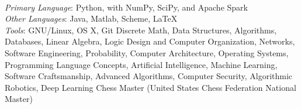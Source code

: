 \documentclass[11pt]{article}
\begin{document}
\begin{adjustwidth}{-2.2cm}{-2.2cm}
    ~\\[0.01\baselineskip]
    \emph{Primary Language}: Python, with NumPy, SciPy, and Apache Spark\\
    \emph{Other Languages}: Java, Matlab, Scheme, \LaTeX\\
    \emph{Tools}: GNU/Linux, OS X, Git
    \eosec
    Discrete Math, Data Structures, Algorithms, Databases, Linear Algebra, Logic Design and Computer Organization, Networks, Software Engineering, Probability, Computer Architecture, Operating Systems, Programming Language Concepts, Artificial Intelligence, Machine Learning, Software Craftsmanship, Advanced Algorithms, Computer Security, Algorithmic Robotics, Deep Learning
    \eosec
    Chess Master (United States Chess Federation National Master)
\end{adjustwidth}
\end{document}
